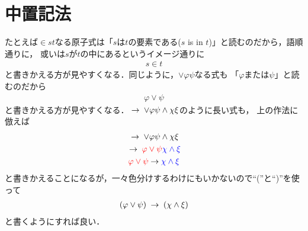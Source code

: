 \section{中置記法}
	たとえば$\in s t$なる原子式は「$s$は$t$の要素である($s$ is in $t$)」と読むのだから，語順通りに，
	或いは$s$が$t$の中にあるというイメージ通りに
	\begin{align}
		s \in t
	\end{align}
	と書きかえる方が見やすくなる．同じように，$\vee \varphi \psi$なる式も
	「$\varphi$または$\psi$」と読むのだから
	\begin{align}
		\varphi \vee \psi
	\end{align}
	と書きかえる方が見やすくなる．$\hspace{0.25em}\rightarrow\hspace{0.25em} \vee \varphi \psi \wedge \chi \xi$のように長い式も，
	上の作法に倣えば
	\begin{align}
		\begin{gathered}
			\hspace{0.25em}\rightarrow\hspace{0.25em} \vee \varphi \psi \wedge \chi \xi \\
			\hspace{0.25em}\rightarrow\hspace{0.25em} \color{red}{\varphi \vee \psi} \color{blue}{\chi \wedge \xi} \\
			\color{red}{\varphi \vee \psi} \color{black}{\hspace{0.25em}\rightarrow\hspace{0.25em}} \color{blue}{\chi \wedge \xi}
		\end{gathered}
	\end{align}
	と書きかえることになるが，一々色分けするわけにもいかないので``(''と``)''を使って
	\begin{align}
		(\varphi \vee \psi) \hspace{0.25em}\rightarrow\hspace{0.25em} (\chi \wedge \xi)
	\end{align}
	と書くようにすれば良い．
	

